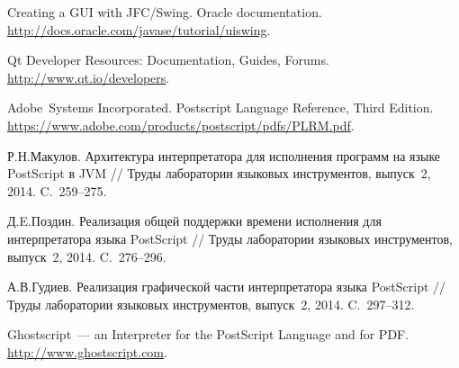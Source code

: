 \begin{thebibliography}{99}

   Creating a GUI with JFC/Swing. Oracle documentation. \url{http://docs.oracle.com/javase/tutorial/uiswing}.

   Qt Developer Resources: Documentation, Guides, Forums. \url{http://www.qt.io/developers}.

   Adobe~Systems Incorporated. Postscript Language Reference, Third Edition.
  \url{https://www.adobe.com/products/postscript/pdfs/PLRM.pdf}.

  Р.Н.Макулов. Архитектура интерпретатора для исполнения программ на языке PostScript в JVM //
  Труды лаборатории языковых инструментов, выпуск~2, 2014. C.~259--275.

  Д.E.Поздин. Реализация общей поддержки времени исполнения для интерпретатора языка
  PostScript // Труды лаборатории языковых инструментов, выпуск~2, 2014. C.~276--296.

  А.В.Гудиев. Реализация графической части интерпретатора языка PostScript //
  Труды лаборатории языковых инструментов, выпуск~2, 2014. C.~297--312.

  Ghostscript~--- an Interpreter for the PostScript Language and for PDF.
  \url{http://www.ghostscript.com}.
\end{thebibliography}

